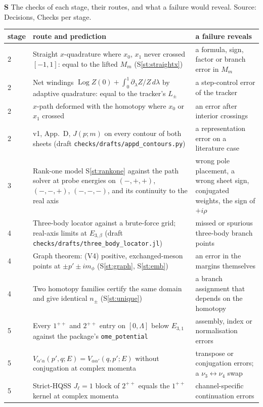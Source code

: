 \documentclass[11pt]{article}
\newcommand{\file}[1]{\nolinkurl{#1}}
\newcounter{stmt}
\newenvironment{stmt}[1]{\par\smallskip\refstepcounter{stmt}\noindent\textbf{S\thestmt}\enspace[\textsf{#1}]\enspace\ignorespaces}{\par\smallskip}
\newcommand{\Sr}[1]{S\ref{#1}}
\begin{document}
\begin{stmt}{definition}\label{st:checks}
The checks of each stage, their routes, and what a failure would reveal. Source: Decisions, Checks per stage.
\end{stmt}
\begin{xltabular}{\textwidth}{@{}lLL@{}}
\toprule
stage & route and prediction & a failure reveals\\
\midrule
{} & Straight $x$-quadrature where $x_0$, $x_1$ never crossed $[-1,1]$: equal to the lifted $M_m$ (\Sr{st:straightx}) & a formula, sign, factor or branch error in $M_m$\\
2 & Net windings $\operatorname{Log}Z(0)+\int_0^1\partial_\lambda Z/Z\,d\lambda$ by adaptive quadrature: equal to the tracker's $L_\pm$ & a step-control error of the tracker\\
2 & $x$-path deformed with the homotopy where $x_0$ or $x_1$ crossed & an error after interior crossings\\
2 & \cite{Wu:2026wxb} v1, App.~D, $J(p;m)$ on every contour of both sheets (draft \file{checks/drafts/appd_contours.py}) & a representation error on a literature case\\
3 & Rank-one model \Sr{st:rankone} against the path solver at probe energies on $(-,+,+)$, $(-,-,+)$, $(-,-,-)$, and its continuity to the real axis & wrong pole placement, a wrong sheet sign, conjugated weights, the sign of $+i\rho$\\
4 & Three-body locator against a brute-force grid; real-axis limits at $E_{3,\beta}$ (draft \file{checks/drafts/three_body_locator.jl}) & missed or spurious three-body branch points\\
4 & Graph theorem: (V4) positive, exchanged-meson points at $\pm p'\pm im_\phi$ (\Sr{st:graph}, \Sr{st:emb}) & an error in the margins themselves\\
4 & Two homotopy families certify the same domain and give identical $n_\pm$ (\Sr{st:unique}) & a branch assignment that depends on the homotopy\\
5 & Every $1^{++}$ and $2^{++}$ entry on $[0,\Lambda]$ below $E_{3,1}$ against the package's \texttt{ome\_potential} & assembly, index or normalisation errors\\
5 & $V_{\alpha'\alpha}(p',q;E)=V_{\alpha\alpha'}(q,p';E)$ without conjugation at complex momenta & transpose or conjugation errors; a $\nu_3\leftrightarrow\nu_4$ swap\\
5 & Strict-HQSS $J_\ell=1$ block of $2^{++}$ equals the $1^{++}$ kernel at complex momenta & channel-specific continuation errors\\

\end{xltabular}
\end{document}
